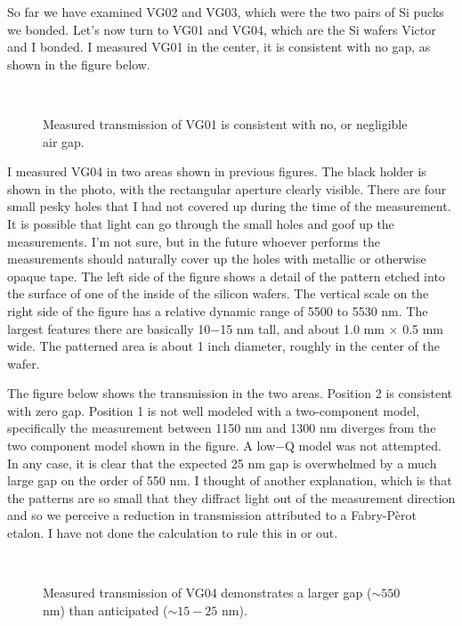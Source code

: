 So far we have examined VG02 and VG03, which were the two pairs of Si pucks we bonded.  Let's now turn to VG01 and VG04, which are the Si wafers Victor and I bonded.  I measured VG01 in the center, it is consistent with no gap, as shown in the figure below.

\begin{figure}[h!] 
\begin{center}
\ 
\caption[VG01 transmission]{Measured transmission of VG01 is consistent with no, or negligible air gap.}
\label{fig:VG01trans}
\end{center}
\end{figure}

I measured VG04 in two areas shown in previous figures.  The black holder is shown in the photo, with the rectangular aperture clearly visible.  There are four small pesky holes that I had not covered up during the time of the measurement.  It is possible that light can go through the small holes and goof up the measurements.  I'm not sure, but in the future whoever performs the measurements should naturally cover up the holes with metallic or otherwise opaque tape.  The left side of the figure shows a detail of the pattern etched into the surface of one of the inside of the silicon wafers.  The vertical scale on the right side of the figure has a relative dynamic range of 5500 to 5530 nm.  The largest features there are basically 10$-$15 nm tall, and about 1.0 mm $\times$ 0.5 mm wide.  The patterned area is about 1 inch diameter, roughly in the center of the wafer.

The figure below shows the transmission in the two areas.  Position 2 is consistent with zero gap.  Position 1 is not well modeled with a two-component model, specifically the measurement between 1150 nm and 1300 nm diverges from the two component model shown in the figure.  A low$-$Q model was not attempted.  In any case, it is clear that the expected 25 nm gap is overwhelmed by a much large gap on the order of 550 nm.  I thought of another explanation, which is that the patterns are so small that they diffract light out of the measurement direction and so we perceive a reduction in transmission attributed to a Fabry-P\`erot etalon.  I have not done the calculation to rule this in or out.

\begin{figure}[h!] 
\begin{center}
\ 
\caption[VG04 transmission]{Measured transmission of VG04 demonstrates a larger gap ($\sim550$ nm) than anticipated ($\sim15-25$ nm).  }
\label{fig:VG04trans}
\end{center}
\end{figure}

